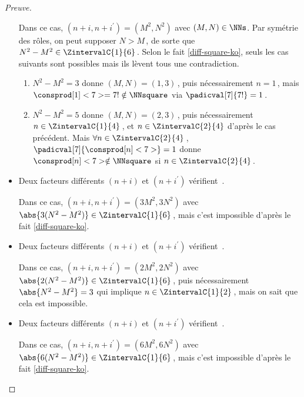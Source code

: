 \begin{proof}[Preuve]
\begin{itemize}
		\smallskip
		\noindent
		Dans ce cas, $(n+i, n+i^\prime) = (M^2, N^2)$ avec $(M, N) \in \NNs$.
		Par symétrie des rôles, on peut supposer $N > M$\,, de sorte que $N^2 - M^2 \in \ZintervalC{1}{6}$\,. 
		Selon le fait \ref{diff-square-ko}, seuls les cas suivants sont possibles mais ils lèvent tous une contradiction.
		\begin{enumerate}
			\item $N^2 - M^2 = 3$ donne $(M, N) = (1, 3)$\,, puis nécessairement $n = 1$\,, mais $\consprod[1]<7> = 7! \notin \NNsquare$ via $\padicval[7]{7!} = 1$\,.


			\item $N^2 - M^2 = 5$ donne $(M, N) = (2, 3)$\,, puis nécessairement $n \in \ZintervalC{1}{4}$\,, et $n \in \ZintervalC{2}{4}$ d'après le cas précédent.
			Mais $\forall n \in \ZintervalC{2}{4}$\,, $\padicval[7]{\consprod[n]<7>} = 1$ donne $\consprod[n]<7> \notin \NNsquare$ si $n \in \ZintervalC{2}{4}$\,.
		\end{enumerate}


    	\medskip
		\item Deux facteurs différents $(n+i)$ et $(n+i^\prime)$ vérifient \,.
		
		\smallskip
		\noindent
		Dans ce cas, $(n+i, n+i^\prime) = (3 M^2, 3 N^2)$ avec $\abs{3(N^2 - M^2)} \in \ZintervalC{1}{6}$\,, mais c'est impossible d'après le fait \ref{diff-square-ko}.

    	\medskip
		\item Deux facteurs différents $(n+i)$ et $(n+i^\prime)$ vérifient \,.
		
		\smallskip
		\noindent
		Dans ce cas, $(n+i, n+i^\prime) = (2 M^2, 2 N^2)$ avec $\abs{2(N^2 - M^2)} \in \ZintervalC{1}{6}$\,, puis nécessairement $\abs{N^2 - M^2} = 3$ qui implique $n \in \ZintervalC{1}{2}$\,, mais on sait que cela est impossible.


    	\medskip
		\item Deux facteurs différents $(n+i)$ et $(n+i^\prime)$ vérifient \,.
		
		\smallskip
		\noindent
		Dans ce cas, $(n+i, n+i^\prime) = (6 M^2, 6 N^2)$ avec $\abs{6(N^2 - M^2)} \in \ZintervalC{1}{6}$\,, mais c'est impossible d'après le fait \ref{diff-square-ko}.
		\qedhere
    \end{itemize}
\end{proof}

 